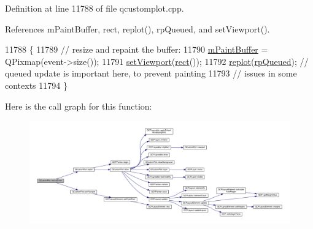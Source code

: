 Definition at line 11788 of file qcustomplot.\+cpp.



References m\+Paint\+Buffer, rect, replot(), rp\+Queued, and set\+Viewport().


\begin{DoxyCode}
11788                                                  \{
11789   \textcolor{comment}{// resize and repaint the buffer:}
11790   \hyperlink{class_q_custom_plot_a753630df96e0672098d9e88bd41d1913}{mPaintBuffer} = QPixmap(event->size());
11791   \hyperlink{class_q_custom_plot_a3f9bc4b939dd8aaba9339fd09f273fc4}{setViewport}(\hyperlink{_gen_blob_8m_aea8f6815d9a63491fc422c5572c6b3c3}{rect}());
11792   \hyperlink{class_q_custom_plot_a606fd384b2a637ce2c24899bcbde77d6}{replot}(\hyperlink{class_q_custom_plot_a45d61392d13042e712a956d27762aa39aaaae083a19bc668597bf0f86e000f798}{rpQueued}); \textcolor{comment}{// queued update is important here, to prevent painting}
11793                     \textcolor{comment}{// issues in some contexts}
11794 \}
\end{DoxyCode}


Here is the call graph for this function\+:\nopagebreak
\begin{figure}[H]
\begin{center}
\leavevmode
\includegraphics[width=350pt]{class_q_custom_plot_a13e05523a40c3f08875df5cde85cf0d9_cgraph}
\end{center}
\end{figure}


\hypertarget{class_q_custom_plot_a6629d9e8e6da4bf18055ee0257fdce9a}{}

